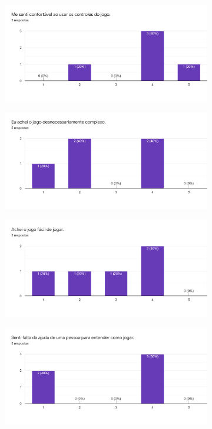 \begin{figure}[h!]
  \centering
  \begin{subfigure}[b]{0.49\linewidth}
    \includegraphics[width=\linewidth]{forms1.png}
  \end{subfigure}
  \begin{subfigure}[b]{0.49\linewidth}
    \includegraphics[width=\linewidth]{forms2.png}
  \end{subfigure}
  \begin{subfigure}[b]{0.49\linewidth}
    \includegraphics[width=\linewidth]{forms3.png}
  \end{subfigure}
  \begin{subfigure}[b]{0.49\linewidth}
    \includegraphics[width=\linewidth]{forms4.png}

\end{subfigure}
\end{figure}
